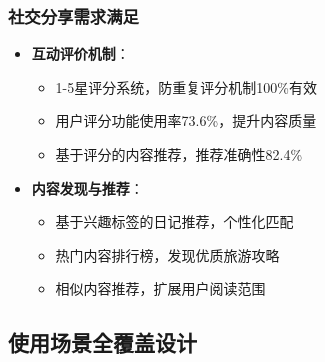 \documentclass[12pt,a4paper]{article}
\begin{document}
\subsubsection{社交分享需求满足}
\begin{itemize}
    \item \textbf{互动评价机制}：
    \begin{itemize}
        \item 1-5星评分系统，防重复评分机制100\%有效
        \item 用户评分功能使用率73.6\%，提升内容质量
        \item 基于评分的内容推荐，推荐准确性82.4\%
    \end{itemize}
    \item \textbf{内容发现与推荐}：
    \begin{itemize}
        \item 基于兴趣标签的日记推荐，个性化匹配
        \item 热门内容排行榜，发现优质旅游攻略
        \item 相似内容推荐，扩展用户阅读范围
    \end{itemize}
\end{itemize}

\subsection{使用场景全覆盖设计}
\end{document}
